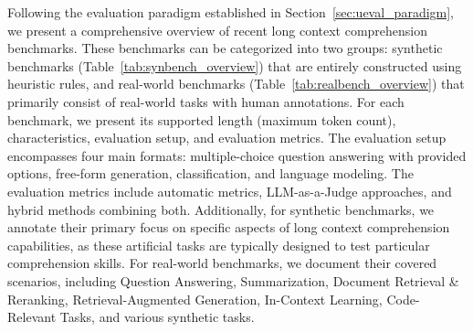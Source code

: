 \documentclass[11pt, a4paper, logo, copyright, nonumbering]{map}
\begin{document}
Following the evaluation paradigm established in Section~\ref{sec:ueval_paradigm}, we present a comprehensive overview of recent long context comprehension benchmarks. These benchmarks can be categorized into two groups: synthetic benchmarks (Table~\ref{tab:synbench_overview}) that are entirely constructed using heuristic rules, and real-world benchmarks (Table~\ref{tab:realbench_overview}) that primarily consist of real-world tasks with human annotations. For each benchmark, we present its supported length (maximum token count), characteristics, evaluation setup, and evaluation metrics. The evaluation setup encompasses four main formats: multiple-choice question answering with provided options, free-form generation, classification, and language modeling. The evaluation metrics include automatic metrics, LLM-as-a-Judge approaches, and hybrid methods combining both.
Additionally, for synthetic benchmarks, we annotate their primary focus on specific aspects of long context comprehension capabilities, as these artificial tasks are typically designed to test particular comprehension skills. For real-world benchmarks, we document their covered scenarios, including Question Answering, Summarization, Document Retrieval \& Reranking, Retrieval-Augmented Generation, In-Context Learning, Code-Relevant Tasks, and various synthetic tasks.
\end{document}
